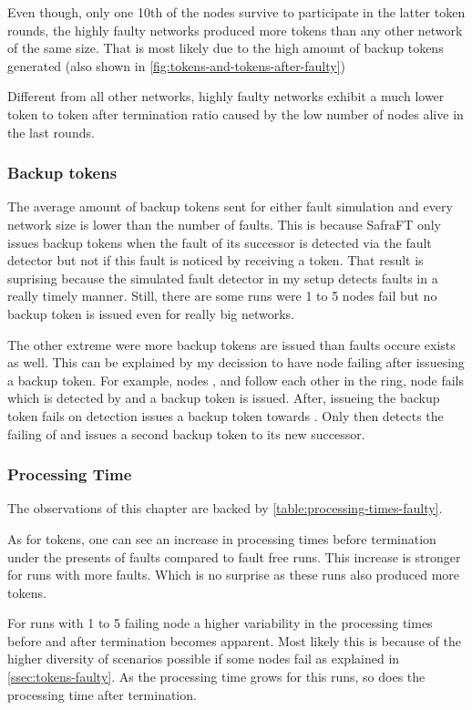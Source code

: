 Even though, only one 10th of the nodes survive to participate in the latter token rounds, the highly faulty networks produced more tokens than any other network of the same size.
That is most likely due to the high amount of backup tokens generated (also shown in \cref{fig:tokens-and-tokens-after-faulty})

Different from all other networks, highly faulty networks exhibit a much lower token to token after termination ratio caused by the low number of nodes alive in the last rounds.
    
\subsubsection{Backup tokens}
The average amount of backup tokens sent for either fault simulation and every network size is lower than the number of faults.
This is because SafraFT only issues backup tokens when the fault of its successor is detected via the fault detector but not if this fault is noticed by receiving a token.
That result is suprising because the simulated fault detector in my setup detects faults in a really timely manner.
Still, there are some runs were 1 to 5 nodes fail but no backup token is issued even for really big networks. 

The other extreme were more backup tokens are issued than faults occure exists as well.
This can be explained by my decission to have node failing after issuesing a backup token.
For example, nodes ,  and  follow each other in the ring, node  fails which is detected by  and a backup token is issued.
After, issueing the backup token  fails on detection  issues a backup token towards .
Only then  detects the failing of  and issues a second backup token to its new successor.  


\subsubsection{Processing Time}
The observations of this chapter are backed by \cref{table:processing-times-faulty}.

As for tokens, one can see an increase in processing times before termination under the presents of faults compared to fault free runs. 
This increase is stronger for runs with more faults.
Which is no surprise as these runs also produced more tokens.

For runs with 1 to 5 failing node a higher variability in the processing times before and after termination becomes apparent. 
Most likely this is because of the higher diversity of scenarios possible if some nodes fail  as explained in \cref{ssec:tokens-faulty}.
As the processing time grows for this runs, so does the processing time after termination.

